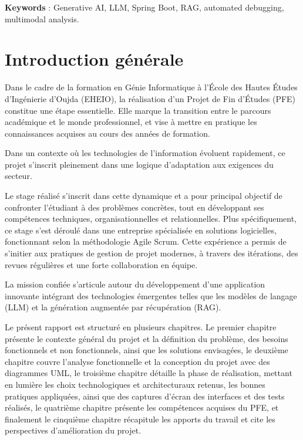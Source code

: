 \documentclass[12pt,a4paper]{report}
\begin{document}
	\textbf{Keywords} : Generative AI, LLM, Spring Boot, RAG, automated debugging, multimodal analysis.


	\clearpage
	\tableofcontents

	\clearpage
	\listoffigures
	
	
	\clearpage
	\listoftables
	
	\clearpage
	
	
	\chapter*{Introduction générale}
	
	Dans le cadre de la formation en Génie Informatique à l’École des Hautes Études d’Ingénierie d’Oujda (EHEIO), la réalisation d’un Projet de Fin d’Études (PFE) constitue une étape essentielle. Elle marque la transition entre le parcours académique et le monde professionnel, et vise à mettre en pratique les connaissances acquises au cours des années de formation.
	
	Dans un contexte où les technologies de l’information évoluent rapidement, ce projet s’inscrit pleinement dans une logique d’adaptation aux exigences du secteur.
	
	Le stage réalisé s’inscrit dans cette dynamique et a pour principal objectif de confronter l’étudiant à des problèmes concrètes, tout en développant ses compétences techniques, organisationnelles et relationnelles. Plus spécifiquement, ce stage s’est déroulé dans une entreprise spécialisée en solutions logicielles, fonctionnant selon la méthodologie Agile Scrum. Cette expérience a permis de s’initier aux pratiques de gestion de projet modernes, à travers des itérations, des revues régulières et une forte collaboration en équipe.
	
	La mission confiée s’articule autour du développement d’une application innovante intégrant des technologies émergentes telles que les modèles de langage (LLM) et la génération augmentée par récupération (RAG).
	
	Le présent rapport est structuré en plusieurs chapitres. Le premier chapitre présente le contexte général du projet et la définition du problème, des besoins fonctionnels et non fonctionnels, ainsi que les solutions envisagées, le deuxième chapitre couvre l'analyse fonctionnelle et la conception du projet avec des diagrammes UML, le troisième chapitre détaille la phase de réalisation, mettant en lumière les choix technologiques et architecturaux retenus, les bonnes pratiques appliquées, ainsi que des captures d'écran des interfaces et des tests réalisés, le quatrième chapitre présente les compétences acquises du PFE, et finalement le cinquième chapitre récapitule les apports du travail et cite les perspectives d'amélioration du projet.
	
\end{document}
